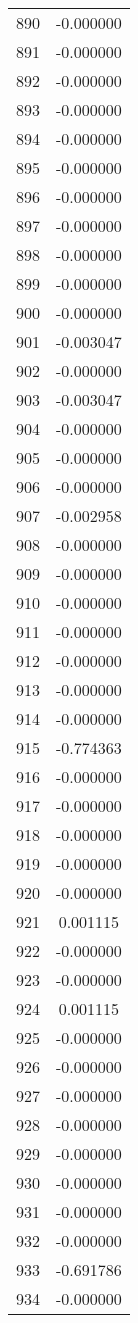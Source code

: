 \documentclass[12pt]{article}
\begin{document}
\begin{longtable}{@{}cc@{}}
890 & -0.000000 \\
891 & -0.000000 \\
892 & -0.000000 \\
893 & -0.000000 \\
894 & -0.000000 \\
895 & -0.000000 \\
896 & -0.000000 \\
897 & -0.000000 \\
898 & -0.000000 \\
899 & -0.000000 \\
900 & -0.000000 \\
901 & -0.003047 \\
902 & -0.000000 \\
903 & -0.003047 \\
904 & -0.000000 \\
905 & -0.000000 \\
906 & -0.000000 \\
907 & -0.002958 \\
908 & -0.000000 \\
909 & -0.000000 \\
910 & -0.000000 \\
911 & -0.000000 \\
912 & -0.000000 \\
913 & -0.000000 \\
914 & -0.000000 \\
915 & -0.774363 \\
916 & -0.000000 \\
917 & -0.000000 \\
918 & -0.000000 \\
919 & -0.000000 \\
920 & -0.000000 \\
921 & 0.001115 \\
922 & -0.000000 \\
923 & -0.000000 \\
924 & 0.001115 \\
925 & -0.000000 \\
926 & -0.000000 \\
927 & -0.000000 \\
928 & -0.000000 \\
929 & -0.000000 \\
930 & -0.000000 \\
931 & -0.000000 \\
932 & -0.000000 \\
933 & -0.691786 \\
934 & -0.000000 \\

\end{longtable}
\end{document}
